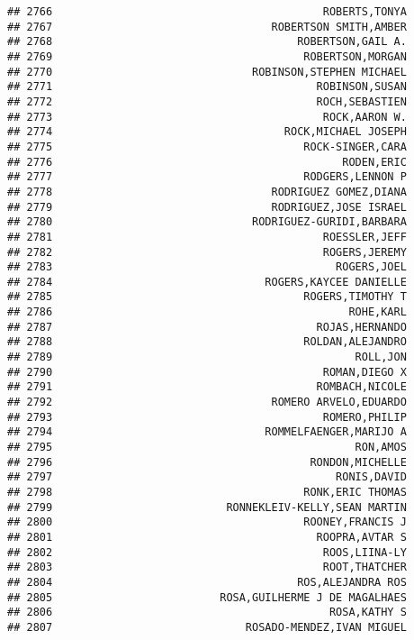 \documentclass[
]{article}
\begin{document}
\begin{verbatim}
## 2766                                          ROBERTS,TONYA
## 2767                                  ROBERTSON SMITH,AMBER
## 2768                                      ROBERTSON,GAIL A.
## 2769                                       ROBERTSON,MORGAN
## 2770                               ROBINSON,STEPHEN MICHAEL
## 2771                                         ROBINSON,SUSAN
## 2772                                         ROCH,SEBASTIEN
## 2773                                          ROCK,AARON W.
## 2774                                    ROCK,MICHAEL JOSEPH
## 2775                                       ROCK-SINGER,CARA
## 2776                                             RODEN,ERIC
## 2777                                       RODGERS,LENNON P
## 2778                                  RODRIGUEZ GOMEZ,DIANA
## 2779                                  RODRIGUEZ,JOSE ISRAEL
## 2780                               RODRIGUEZ-GURIDI,BARBARA
## 2781                                          ROESSLER,JEFF
## 2782                                          ROGERS,JEREMY
## 2783                                            ROGERS,JOEL
## 2784                                 ROGERS,KAYCEE DANIELLE
## 2785                                       ROGERS,TIMOTHY T
## 2786                                              ROHE,KARL
## 2787                                         ROJAS,HERNANDO
## 2788                                       ROLDAN,ALEJANDRO
## 2789                                               ROLL,JON
## 2790                                          ROMAN,DIEGO X
## 2791                                         ROMBACH,NICOLE
## 2792                                  ROMERO ARVELO,EDUARDO
## 2793                                          ROMERO,PHILIP
## 2794                                 ROMMELFAENGER,MARIJO A
## 2795                                               RON,AMOS
## 2796                                        RONDON,MICHELLE
## 2797                                            RONIS,DAVID
## 2798                                       RONK,ERIC THOMAS
## 2799                           RONNEKLEIV-KELLY,SEAN MARTIN
## 2800                                       ROONEY,FRANCIS J
## 2801                                         ROOPRA,AVTAR S
## 2802                                          ROOS,LIINA-LY
## 2803                                          ROOT,THATCHER
## 2804                                      ROS,ALEJANDRA ROS
## 2805                          ROSA,GUILHERME J DE MAGALHAES
## 2806                                           ROSA,KATHY S
## 2807                              ROSADO-MENDEZ,IVAN MIGUEL

\end{verbatim}
\end{document}
